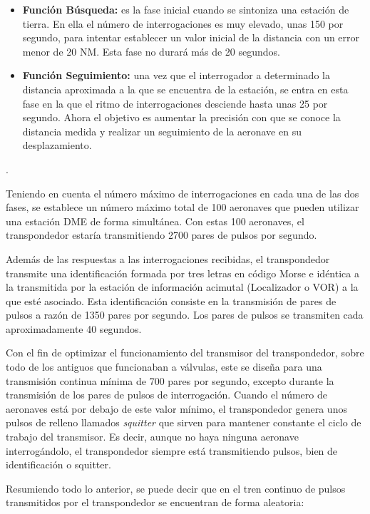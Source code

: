 \begin{itemize}
	\item \textbf{Funci\'on B\'usqueda:} es la fase inicial cuando se sintoniza una estaci\'on de tierra. En ella el n\'umero de interrogaciones es muy elevado, unas 150 por segundo, para intentar establecer un valor inicial de la distancia con un error menor de 20 NM. Esta fase no durar\'a m\'as de 20 segundos.
        \item \textbf{Funci\'on Seguimiento:} una vez que el interrogador a determinado la distancia aproximada a la que se encuentra de la estaci\'on, se entra en esta fase en la que el ritmo de interrogaciones desciende hasta unas 25 por segundo. Ahora el objetivo es aumentar la precisi\'on con que se conoce la distancia medida y realizar un seguimiento de la aeronave en su desplazamiento.
\end{itemize}.

Teniendo en cuenta el n\'umero m\'aximo de interrogaciones en cada una de las dos fases, se establece un n\'umero m\'aximo total de 100 aeronaves que pueden utilizar una estaci\'on DME de forma simult\'anea. Con estas 100 aeronaves, el transpondedor estar\'ia transmitiendo 2700 pares de pulsos por segundo.

Adem\'as de las respuestas a las interrogaciones recibidas, el transpondedor transmite una identificaci\'on formada por tres letras en c\'odigo Morse e id\'entica a la transmitida por la estaci\'on de informaci\'on acimutal (Localizador o VOR) a la que est\'e asociado. Esta identificaci\'on consiste en la transmisi\'on de pares de pulsos a raz\'on de 1350 pares por segundo. Los pares de pulsos se transmiten cada aproximadamente 40 segundos.

Con el fin de optimizar el funcionamiento del transmisor del transpondedor, sobre todo de los antiguos que funcionaban a v\'alvulas, este se dise\~na para una transmisi\'on continua m\'inima de 700 pares por segundo, excepto durante la transmisi\'on de los pares de pulsos de interrogaci\'on. Cuando el n\'umero de aeronaves est\'a por debajo de este valor m\'inimo, el transpondedor genera unos pulsos de relleno llamados \emph{squitter} que sirven para mantener constante el ciclo de trabajo del transmisor. Es decir, aunque no haya ninguna aeronave interrog\'andolo, el transpondedor siempre est\'a transmitiendo pulsos, bien de identificaci\'on o squitter.

Resumiendo todo lo anterior, se puede decir que en el tren continuo de pulsos transmitidos por el transpondedor se encuentran de forma aleatoria:

